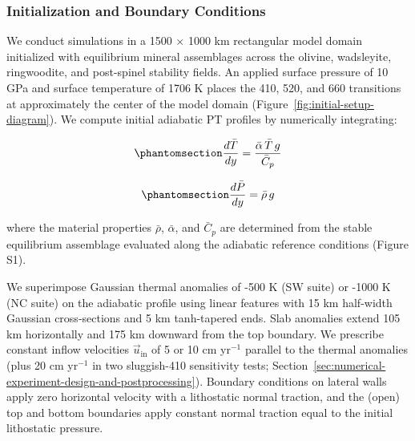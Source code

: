 \documentclass[draft,linenumbers]{agujournal2019}
\begin{document}
\subsubsection{Initialization and Boundary
Conditions}\label{sec:initialization-and-boundary-conditions}

We conduct simulations in a 1500 \(\times\) 1000 km rectangular model
domain initialized with equilibrium mineral assemblages across the
olivine, wadsleyite, ringwoodite, and post-spinel stability fields. An
applied surface pressure of 10 GPa and surface temperature of 1706 K
places the 410, 520, and 660 transitions at approximately the center of
the model domain (Figure~\ref{fig:initial-setup-diagram}). We compute
initial adiabatic PT profiles by numerically integrating:

\begin{equation}\protect\phantomsection\label{eq:adiabatic-temperature}{\frac{d\bar{T}}{dy} = \frac{\bar{\alpha}\, \bar{T}\, g}{\bar{C}_p}}\end{equation}

\begin{equation}\protect\phantomsection\label{eq:adiabatic-pressure}{\frac{d\bar{P}}{dy} = \bar{\rho}\, g}\end{equation}

where the material properties \(\bar{\rho}\), \(\bar{\alpha}\), and
\(\bar{C}_p\) are determined from the stable equilibrium assemblage
evaluated along the adiabatic reference conditions (Figure S1).

We superimpose Gaussian thermal anomalies of -500 K (SW suite) or -1000
K (NC suite) on the adiabatic profile using linear features with 15 km
half-width Gaussian cross-sections and 5 km tanh-tapered ends. Slab
anomalies extend 105 km horizontally and 175 km downward from the top
boundary. We prescribe constant inflow velocities
\(\vec{u}_\mathrm{in}\) of 5 or 10 cm yr\(^{-1}\) parallel to the
thermal anomalies (plus 20 cm yr\(^{-1}\) in two sluggish-410
sensitivity tests;
Section~\ref{sec:numerical-experiment-design-and-postprocessing}).
Boundary conditions on lateral walls apply zero horizontal velocity with
a lithostatic normal traction, and the (open) top and bottom boundaries
apply constant normal traction equal to the initial lithostatic
pressure.
\end{document}
